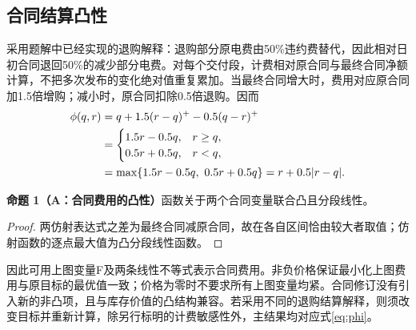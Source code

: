 \documentclass[UTF8,a4paper,zihao=-4,fontset=mac]{ctexart}
\newcommand{\pp}[2]{\par\ifdim\dimexpr\pagegoal-\pagetotal\relax<5\baselineskip\newpage\fi\noindent\textbf{命题 #1（#2）}\quad}
\begin{document}
\subsection{合同结算凸性}
采用题解中已经实现的退购解释：退购部分原电费由50\%违约费替代，因此相对日初合同退回50\%的减少部分电费。对每个交付段，计费相对原合同与最终合同净额计算，不把多次发布的变化绝对值重复累加。当最终合同增大时，费用对应原合同加1.5倍增购；减小时，原合同扣除0.5倍退购。因而
\begin{align}
 \phi(q,r)&=q+1.5(r-q)^+-0.5(q-r)^+\notag\\
 &=\begin{cases}1.5r-0.5q,&r\ge q,\\0.5r+0.5q,&r<q,\end{cases}\label{eq:phi}\\
 &=\max\{1.5r-0.5q,\ 0.5r+0.5q\}=r+0.5|r-q|.\notag
\end{align}
\pp{1}{A：合同费用的凸性}函数关于两个合同变量联合凸且分段线性。
\begin{proof}
两仿射表达式之差为最终合同减原合同，故在各自区间恰由较大者取值；仿射函数的逐点最大值为凸分段线性函数。
\end{proof}
因此可用上图变量F及两条线性不等式表示合同费用。非负价格保证最小化上图费用与原目标的最优值一致；价格为零时不要求所有上图变量均紧。合同修订没有引入新的非凸项，且与库存价值的凸结构兼容。若采用不同的退购结算解释，则须改变目标并重新计算，除另行标明的计费敏感性外，主结果均对应式\eqref{eq:phi}。


\end{document}
